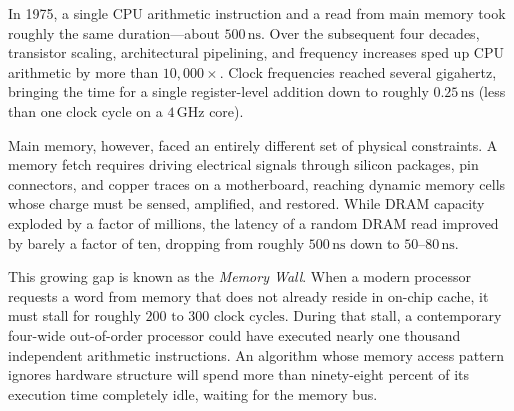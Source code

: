 In 1975, a single CPU arithmetic instruction and a read from main memory took roughly
the same duration---about $500\,\text{ns}$. Over the subsequent four decades,
transistor scaling, architectural pipelining, and frequency increases sped up CPU
arithmetic by more than $10{,}000\times$. Clock frequencies reached several gigahertz,
bringing the time for a single register-level addition down to roughly
$0.25\,\text{ns}$ (less than one clock cycle on a $4\,\text{GHz}$ core).

Main memory, however, faced an entirely different set of physical constraints. A memory
fetch requires driving electrical signals through silicon packages, pin connectors,
and copper traces on a motherboard, reaching dynamic memory cells whose charge must be
sensed, amplified, and restored. While DRAM capacity exploded by a factor of millions,
the latency of a random DRAM read improved by barely a factor of ten, dropping from
roughly $500\,\text{ns}$ down to $50\text{--}80\,\text{ns}$.

This growing gap is known as the \emph{Memory Wall}. When a modern
processor requests a word from memory that does not already reside in on-chip cache,
it must stall for roughly $200\text{ to }300\text{ clock cycles}$. During that stall,
a contemporary four-wide out-of-order processor could have executed
nearly one thousand independent arithmetic instructions. An algorithm whose memory access
pattern ignores hardware structure will spend more than ninety-eight percent of its
execution time completely idle, waiting for the memory bus.

